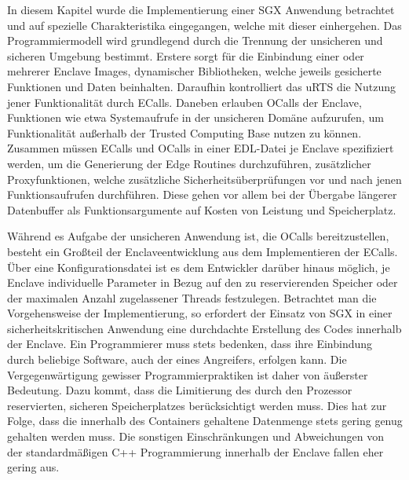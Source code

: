 In diesem Kapitel wurde die Implementierung einer \ac{SGX} Anwendung betrachtet und auf spezielle Charakteristika eingegangen, welche mit dieser einhergehen. Das Programmiermodell wird grundlegend durch die Trennung der unsicheren und sicheren Umgebung bestimmt. Erstere sorgt für die Einbindung einer oder mehrerer Enclave Images, dynamischer Bibliotheken, welche jeweils gesicherte Funktionen und Daten beinhalten. Daraufhin kontrolliert das \ac{uRTS} die Nutzung jener Funktionalität durch \acp{ECall}. Daneben erlauben \acp{OCall} der Enclave, Funktionen wie etwa Systemaufrufe in der unsicheren Domäne aufzurufen, um Funktionalität außerhalb der Trusted Computing Base nutzen zu können. Zusammen müssen \acp{ECall} und \acp{OCall} in einer \ac{EDL}-Datei  je Enclave spezifiziert werden, um die Generierung der Edge Routines durchzuführen, zusätzlicher Proxyfunktionen, welche zusätzliche Sicherheitsüberprüfungen vor und nach jenen Funktionsaufrufen durchführen. Diese gehen vor allem bei der Übergabe längerer Datenbuffer als Funktionsargumente auf Kosten von Leistung und Speicherplatz.

Während es Aufgabe der unsicheren Anwendung ist, die \acp{OCall} bereitzustellen, besteht ein Großteil der Enclaveentwicklung aus dem Implementieren der \acp{ECall}. Über eine Konfigurationsdatei ist es dem Entwickler darüber hinaus möglich, je Enclave individuelle Parameter in Bezug auf den zu reservierenden Speicher oder der maximalen Anzahl zugelassener Threads festzulegen. Betrachtet man die Vorgehensweise der Implementierung, so erfordert der Einsatz von \ac{SGX} in einer sicherheitskritischen Anwendung eine durchdachte Erstellung des Codes innerhalb der Enclave. Ein Programmierer muss stets bedenken, dass ihre Einbindung durch beliebige Software, auch der eines Angreifers, erfolgen kann. Die Vergegenwärtigung gewisser Programmierpraktiken ist daher von äußerster Bedeutung. Dazu kommt, dass die Limitierung des durch den Prozessor reservierten, sicheren Speicherplatzes berücksichtigt werden muss. Dies hat zur Folge, dass die innerhalb des Containers gehaltene Datenmenge stets gering genug gehalten werden muss. Die sonstigen Einschränkungen und Abweichungen von der standardmäßigen C++ Programmierung innerhalb der Enclave fallen eher gering aus.